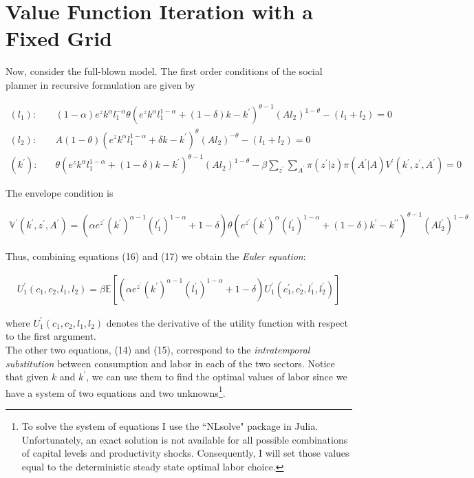 \documentclass[11pt,a4paper]{article}
\begin{document}
\section{Value Function Iteration with a Fixed Grid}
Now, consider the full-blown model. The first order conditions of the social planner in recursive formulation are given by
\begin{small}
\begin{align}
(l_1): \quad  & (1-\alpha)e^z k^{\alpha} l_{1}^{-\alpha} \theta \left(e^z k^{\alpha}l_{1}^{1-\alpha} + (1-\delta) k - k^{\prime}\right)^{\theta-1} \left(A l_{2}\right)^{1-\theta} - \left(l_{1} + l_{2}\right) = 0
\\
(l_2): \quad & A (1-\theta) \left(e^z k^{\alpha}l_{1}^{1-\alpha} + \delta k - k^{\prime}\right)^{\theta} (Al_{2})^{-\theta} - \left(l_{1} + l_{2}\right) = 0 \\
(k^{\prime}): \quad & \theta \left(e^{z} k^{\alpha} l_{1}^{1-\alpha} + (1-\delta) k - k^{\prime}\right)^{\theta-1} (Al_{2})^{1-\theta} - \beta \sum_{z^{\prime}}\sum_{A^{\prime}} \pi\left(z^{\prime}|z\right) \pi\left(A^{\prime}|A\right) V^{\prime}\left(k^{\prime},z^{\prime},A^{\prime}\right) = 0
\end{align}
\end{small}
The envelope condition is
\begin{small} 
\begin{align}
\mathbb{V}^{\prime}\left(k^{\prime},z^{\prime},A^{\prime}\right) =\left(\alpha e^{z^{\prime}} (k^{\prime})^{\alpha-1}(l_{1}^{\prime})^{1-\alpha} +1 - \delta \right) \theta \left(e^{z^{\prime}} (k^{\prime})^{\alpha} (l_{1}^{\prime})^{1-\alpha} + (1-\delta) k^{\prime} - k^{\prime \prime}\right)^{\theta-1} (Al_{2}^{\prime})^{1-\theta}
\end{align}
\end{small}
Thus, combining equations (16) and (17) we obtain the \textit{Euler equation}:
\begin{small}
\begin{align}
U_1^{\prime}(c_1,c_2,l_1,l_2) = \beta \mathbb{E} \left[ (\alpha e^{z^{\prime}} (k^{\prime})^{\alpha-1}(l_{1}^{\prime})^{1-\alpha} + 1- \delta )  U_1^{\prime}(c_1^{\prime},c_2^{\prime}, l^{\prime}_1,l^{\prime}_2) \right]
\end{align}
\end{small}
\hspace{-0.15cm}where $U_1^{\prime}(c_1,c_2,l_1,l_2)$ denotes the derivative of the utility function with respect to the first argument.
\\
The other two equations, (14) and (15), correspond to the \textit{intratemporal substitution} between consumption and labor in each of the two sectors. Notice that given $k$ and $k^{\prime}$, we can use them to find the optimal values of labor since we have a system of two equations and two unknowns\footnote{ To solve the system of equations I use the ``NLsolve" package in Julia. Unfortunately, an exact solution is not available for all possible combinations of capital levels and productivity shocks. Consequently, I will set those values equal to the deterministic steady state optimal labor choice. }. 
\end{document}

